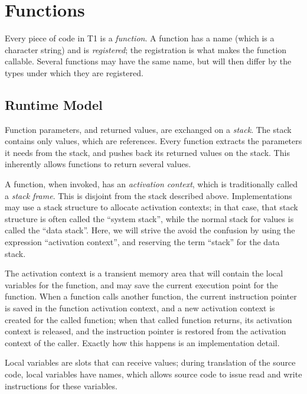 \section{Functions}

Every piece of code in T1 is a \emph{function}. A function has a name
(which is a character string) and is \emph{registered}; the registration
is what makes the function callable. Several functions may have the same
name, but will then differ by the types under which they are registered.

\subsection{Runtime Model}

Function parameters, and returned values, are exchanged on a
\emph{stack}. The stack contains only values, which are references.
Every function extracts the parameters it needs from the stack, and
pushes back its returned values on the stack. This inherently allows
functions to return several values.

A function, when invoked, has an \emph{activation context}, which is
traditionally called a \emph{stack frame}. This is disjoint from the
stack described above. Implementations may use a stack structure to
allocate activation contexts; in that case, that stack structure is
often called the ``system stack'', while the normal stack for values is
called the ``data stack''. Here, we will strive the avoid the confusion
by using the expression ``activation context'', and reserving the term
``stack'' for the data stack.

The activation context is a transient memory area that will contain the
local variables for the function, and may save the current execution
point for the function. When a function calls another function, the
current instruction pointer is saved in the function activation context,
and a new activation context is created for the called function; when
that called function returns, its activation context is released, and
the instruction pointer is restored from the activation context of the
caller. Exactly how this happens is an implementation detail.

Local variables are slots that can receive values; during translation of
the source code, local variables have names, which allows source code to
issue read and write instructions for these variables.

